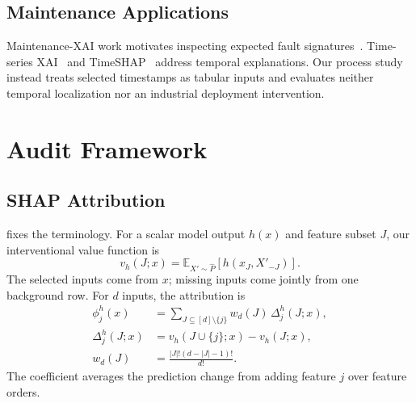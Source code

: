 \documentclass[conference]{IEEEtran}
\begin{document}
\subsection{Maintenance Applications}
Maintenance-XAI work motivates inspecting expected fault signatures~\cite{matzka2020explainable,vollert2021interpretable,cummins2024survey}. Time-series XAI~\cite{theissler2022review} and TimeSHAP~\cite{bento2021timeshap} address temporal explanations. Our process study instead treats selected timestamps as tabular inputs and evaluates neither temporal localization nor an industrial deployment intervention.

\section{Audit Framework}
\label{sec:framework}
\subsection{SHAP Attribution}
 fixes the terminology. For a scalar model output $h(x)$ and feature subset $J$, our interventional value function is
\begin{equation}
 v_h(J;x)=\mathbb E_{X'\sim\widehat P}[h(x_J,X'_{-J})].
 \label{eq:background}
\end{equation}
The selected inputs come from $x$; missing inputs come jointly from one background row. For $d$ inputs, the attribution is
\begin{align}
 \phi_j^h(x)&=\sum_{J\subseteq[d]\setminus\{j\}}w_d(J)\,\Delta_j^h(J;x),\label{eq:shap}\\
 \Delta_j^h(J;x)&=v_h(J\cup\{j\};x)-v_h(J;x),\\
 w_d(J)&=\frac{|J|!(d-|J|-1)!}{d!}.
\end{align}
The coefficient averages the prediction change from adding feature $j$ over feature orders.
\end{document}
